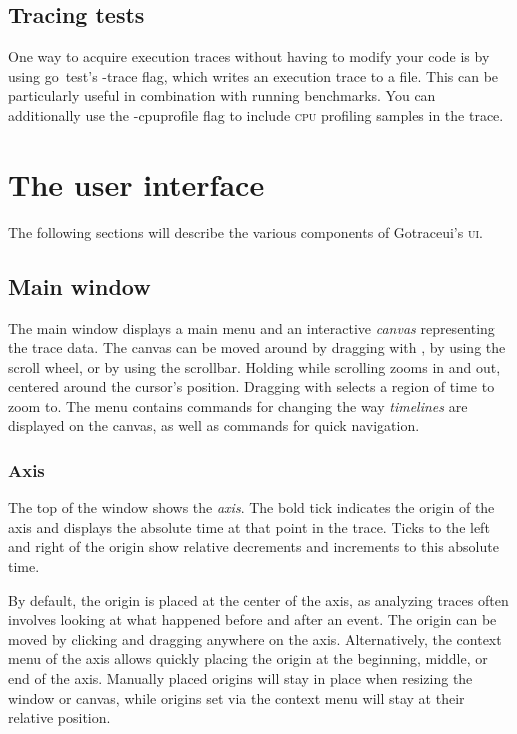 \documentclass[10pt,letterpaper,oneside,openany,english]{memoir}
\newcommand{\code}[1]{{\ttfamily\mbox{#1}}}
\newcommand{\noun}[1]{{\emph{#1}}}
\newcommand{\shortcut}{\ctrl{} or \cmdmac}
\begin{document}
\section{Tracing tests}

One way to acquire execution traces without having to modify your code is by using \code{go test}'s \code{-trace} flag, which writes an execution trace to a file.
This can be particularly useful in combination with running benchmarks.
You can additionally use the \code{-cpuprofile} flag to include \textsc{cpu} profiling samples in the trace.


\chapter{The user interface}
The following sections will describe the various components of Gotraceui's \textsc{ui}.

\section{Main window}
The main window displays a main menu and an interactive \noun{canvas} representing the trace data.
The canvas can be moved around by dragging with , by using the scroll wheel, or by using the scrollbar.
Holding \keys{\shortcut} while scrolling zooms in and out, centered around the cursor's position.
Dragging with \keys{\shortcut+LMB} selects a region of time to zoom to.
The  menu contains commands for changing the way \noun{timelines} are displayed on the canvas,
as well as commands for quick navigation.

\subsection{Axis}
The top of the window shows the \noun{axis}.
The bold tick indicates the origin of the axis and displays the absolute time at that point in the trace.
Ticks to the left and right of the origin show relative decrements and increments to this absolute time.

By default, the origin is placed at the center of the axis,
as analyzing traces often involves looking at what happened before and after an event.
The origin can be moved by clicking and dragging anywhere on the axis.
Alternatively, the context menu of the axis allows quickly placing the origin at the beginning, middle, or end of the axis.
Manually placed origins will stay in place when resizing the window or canvas,
while origins set via the context menu will stay at their relative position.
\end{document}

